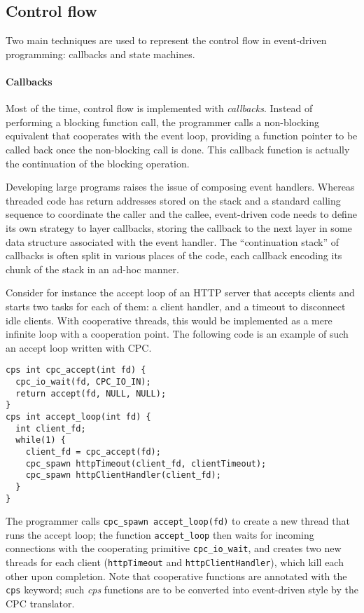 \documentclass[a4paper]{llncs}
\begin{document}
\subsection{Control flow}
\label{sec:control-flow}

Two main techniques are used to represent the control flow in event-driven
programming: callbacks and state machines.

\paragraph{Callbacks}

Most of the time, control flow is implemented with \emph{callbacks}.  Instead
of performing a blocking function call, the programmer calls a non-blocking
equivalent that cooperates with the event loop, providing a function pointer
to be called back once the non-blocking call is done.  This callback function
is actually the continuation of the blocking operation.

Developing large programs raises the issue of composing event handlers.
Whereas threaded code has return addresses stored on the stack and a standard
calling sequence to coordinate the caller and the callee,
event-driven code needs to define its own strategy to layer callbacks, storing
the callback to the next layer in some data structure associated with the
event handler.  The ``continuation stack'' of callbacks is often split in
various places of the code, each callback encoding its chunk of the stack in
an ad-hoc manner.

Consider for instance the accept loop of an HTTP server that accepts clients and
starts two tasks for each of them: a client handler, and a timeout to disconnect
idle clients.  With cooperative threads, this would be implemented as a mere
infinite loop with a cooperation point.  The following code is an example of
such an accept loop written with CPC.
\begin{lstlisting}
cps int cpc_accept(int fd) {
  cpc_io_wait(fd, CPC_IO_IN);
  return accept(fd, NULL, NULL);
}
cps int accept_loop(int fd) {
  int client_fd;
  while(1) {
    client_fd = cpc_accept(fd);
    cpc_spawn httpTimeout(client_fd, clientTimeout);
    cpc_spawn httpClientHandler(client_fd);
  }
}
\end{lstlisting}
The programmer calls \texttt{cpc\_spawn accept\_loop(fd)} to create a new thread
that runs the accept loop; the function \texttt{accept\_loop} then waits for
incoming connections with the cooperating primitive \texttt{cpc\_io\_wait}, and
creates two new threads for each client (\texttt{httpTimeout} and
\texttt{httpClientHandler}), which kill each other upon completion.  Note that
cooperative functions are annotated with the \texttt{cps} keyword; such
\emph{cps} functions are to be converted into event-driven style by the CPC
translator.
\end{document}
